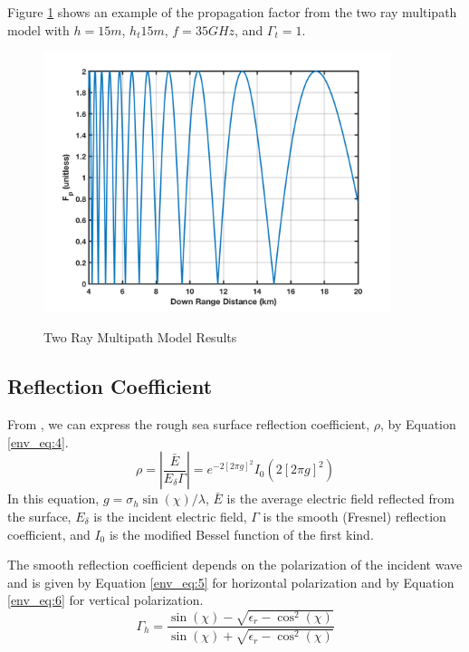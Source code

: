 Figure \ref{env_fig:3t} shows an example of the propagation factor from the two ray multipath model with $h = 15m$, $h_t 15m$, $f = 35GHz$, and $\Gamma_t = 1$. 
\begin{figure}[H]
  \begin{center}
\includegraphics[width=4in]{../media/multistatic/two_ray_multipath_results.png}
  \end{center}
  \renewcommand{\baselinestretch}{1} \small\normalsize
  \begin{quote}
    \caption[Two Ray Multipath Model Results]{Two Ray Multipath Model Results\label{env_fig:3t}}
  \end{quote}
\end{figure}
\renewcommand{\baselinestretch}{2} \small\normalsize


\subsection{Reflection Coefficient}
From \cite{miller_reflection}, we can express the rough sea surface reflection coefficient, $\rho$, by Equation \ref{env_eq:4}. 
  \begin{equation}
  \label{env_eq:4}
\rho = \left|\frac{\bar{E}}{E_\delta \Gamma} \right| = e^{-2\left[2\pi g \right]^2}I_0\left( 2\left[2\pi g \right]^2\right) 
\end{equation}
In this equation, $g = \sigma_h\sin(\chi)/\lambda$, $\bar{E}$ is the average electric field reflected from the surface, $E_\delta$ is the incident electric field, $\Gamma$ is the smooth (Fresnel) reflection coefficient, and $I_0$ is the modified Bessel function of the first kind.

The smooth reflection coefficient depends on the polarization of the incident wave and is given by Equation \ref{env_eq:5} for horizontal polarization and by Equation \ref{env_eq:6} for vertical polarization.
  \begin{equation}
  \label{env_eq:5}
 \Gamma_h = \frac{\sin(\chi)- \sqrt{\epsilon_r - \cos^2(\chi)}}{\sin(\chi) + \sqrt{\epsilon_r - \cos^2(\chi)}}
  \end{equation}
  
